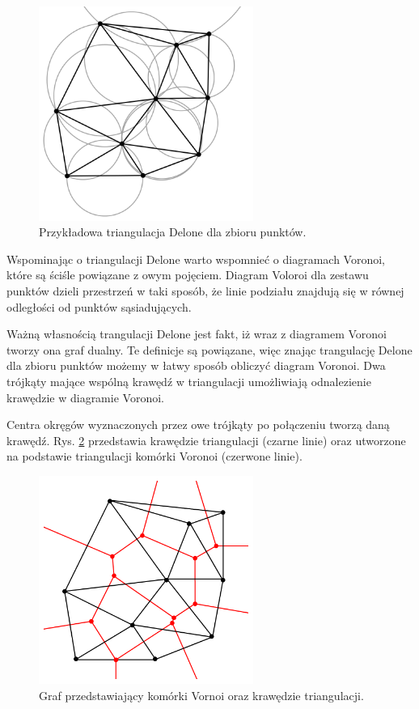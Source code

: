 \begin{figure}[h]
	\centering
	\includegraphics[width=7cm]{triangulation.png}
	\caption{Przykładowa triangulacja Delone dla zbioru punktów. \cite{tDelone}}
	\label{fig:delone}
\end{figure}

Wspominając o triangulacji Delone warto wspomnieć o diagramach Voronoi, które są ściśle powiązane z owym pojęciem. Diagram Voloroi dla zestawu punktów dzieli przestrzeń w taki sposób, że linie podziału znajdują się w równej odległości od punktów sąsiadujących.

Ważną własnością trangulacji Delone jest fakt, iż wraz z diagramem Voronoi tworzy ona graf dualny. Te definicje są powiązane, więc znając trangulację Delone dla zbioru punktów możemy w łatwy sposób obliczyć diagram Voronoi. Dwa trójkąty mające wspólną krawędź w triangulacji umożliwiają odnalezienie krawędzie w diagramie Voronoi. 

Centra okręgów wyznaczonych przez owe trójkąty po połączeniu tworzą daną krawędź. Rys. \ref{fig:voronoi}  przedstawia krawędzie triangulacji (czarne linie) oraz utworzone na podstawie triangulacji komórki Voronoi (czerwone linie).

\begin{figure}[h]
	\centering
	\includegraphics[width=7cm]{voronoi.png}
	\caption{Graf przedstawiający komórki Vornoi oraz krawędzie triangulacji. \cite{tDelone}} 
	\label{fig:voronoi}
\end{figure}

